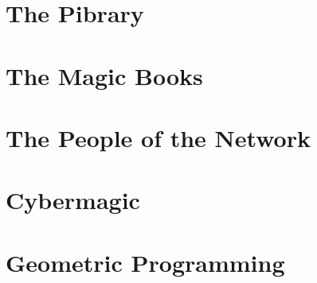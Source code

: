 \documentclass[ebook,12pt,openany]{memoir} %
\begin{document}
\chapter{The Pibrary}

\chapter{The Magic Books}

\chapter{The People of the Network}

\chapter{Cybermagic}

\chapter{Geometric Programming}



\end{document}
